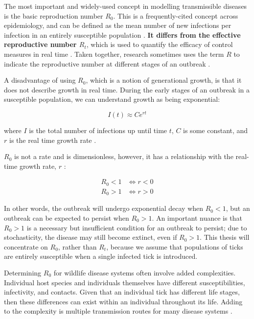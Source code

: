 \documentclass{article}
\begin{document}
The most important and widely-used concept in modelling transmissible diseases is the basic reproduction number $ R_0 $. This is a frequently-cited concept across epidemiology, and can be defined as the mean number of new infections per infection in an entirely susceptible population \cite{Diekman2000}. \textbf{It differs from the effective reproductive number $ R_t $}, which is used to quantify the efficacy of control measures in real time \cite{Lim2020}. Taken together, research sometimes uses the term $ R $ to indicate the reproductive number at different stages of an outbreak \cite{Jewell2022}.

A disadvantage of using $ R_0 $, which is a notion of generational growth, is that it does not describe growth in real time. During the early stages of an outbreak in a susceptible population, we can understand growth as being exponential:

\begin{equation}
	I(t) \approx Ce^{rt}
\end{equation}

where $ I $ is the total number of infections up until time $ t $, $ C $ is some constant, and $ r $ is the real time growth rate \cite{Diekman2000}.

$ R_0 $ is not a rate and is dimensionless, however, it has a relationship with the real-time growth rate, $ r $ \cite{Diekman2000}:

\begin{align}\label{R0}
  R_0 < 1 &\iff r < 0 \nonumber \\
  R_0 > 1 &\iff r > 0
\end{align}

In other words, the outbreak will undergo exponential decay when $ R_0 < 1 $, but an outbreak can be expected to persist when $ R_0 > 1 $. An important nuance is that $ R_0 > 1 $ is a necessary but insufficient condition for an outbreak to persist; due to stochasticity, the disease may still become extinct, even if $ R_0 > 1 $. This thesis will concentrate on $ R_0 $, rather than $ R_t $, because we assume that populations of ticks are entirely susceptible when a single infected tick is introduced.

Determining $ R_0 $ for wildlife disease systems often involve added complexities. Individual host species and individuals themselves have different susceptibilities, infectivity, and contacts. Given that an individual tick has different life stages, then these differences can exist within an individual throughout its life. Adding to the complexity is multiple transmission routes for many disease systems \cite{Hartemink2008}.
\end{document}
